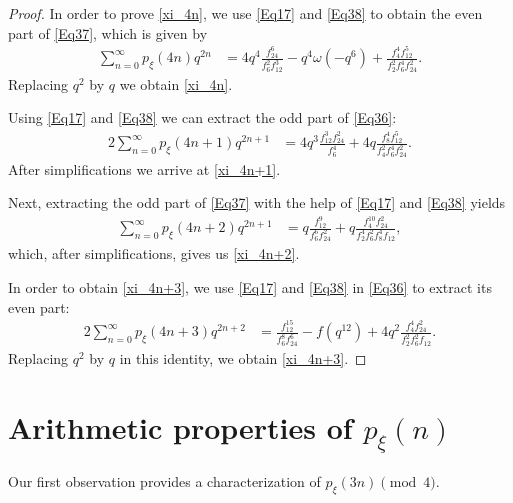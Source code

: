 \documentclass[12pt]{article}
\begin{document}
\begin{proof} 
In order to prove \eqref{xi_4n}, we use \eqref{Eq17} and \eqref{Eq38} to obtain the even part of \eqref{Eq37}, which is given by 
\begin{align*}
\sum_{n=0}^{\infty} p_{\xi}(4n)q^{2n} & = 4q^4\frac{f_{24}^6}{f_6^2f_{12}^3} -q^4\omega(-q^6) + \frac{f_4^{4}f_{12}^5}{f_2^2f_6^4f_{24}^2}.
\end{align*}
Replacing $q^2$ by $q$ we obtain \eqref{xi_4n}.	
	
Using \eqref{Eq17} and \eqref{Eq38} we can extract the odd part of \eqref{Eq36}:
\begin{align*}
2\sum_{n=0}^{\infty} p_{\xi}(4n+1)q^{2n+1} & = 4q^3\frac{f_{12}^3f_{24}^2}{f_6^4}  + 4q\frac{f_8^4f_{12}^5}{f_4^2f_6^4f_{24}^2}.
\end{align*}
After simplifications we arrive at \eqref{xi_4n+1}.

Next, extracting the odd part of \eqref{Eq37} with the help of \eqref{Eq17} and \eqref{Eq38} yields 
\begin{align*}
\sum_{n=0}^{\infty} p_{\xi}(4n+2)q^{2n+1} & = q\frac{f_{12}^9}{f_6^6f_{24}^2}  + q\frac{f_4^{10}f_{24}^2}{f_2^4f_6^2f_{8}^4f_{12}},
\end{align*}
which, after simplifications, gives us \eqref{xi_4n+2}.

In order to obtain \eqref{xi_4n+3}, we use \eqref{Eq17} and \eqref{Eq38} in \eqref{Eq36} to extract its even part:
\begin{align*}
2\sum_{n=0}^{\infty} p_{\xi}(4n+3)q^{2n+2} & = \frac{f_{12}^{15}}{f_6^8f_{24}^6}  -f(q^{12}) + 4q^2\frac{f_4^4f_{24}^2}{f_2^2f_6^2f_{12}}.
\end{align*}
Replacing $q^2$ by $q$ in this identity, we obtain \eqref{xi_4n+3}.
\end{proof}


\section{Arithmetic properties of $p_{\xi}(n)$}
\label{Main}
Our first observation provides a characterization of $p_{\xi}(3n) \pmod{4}.$
\end{document}

